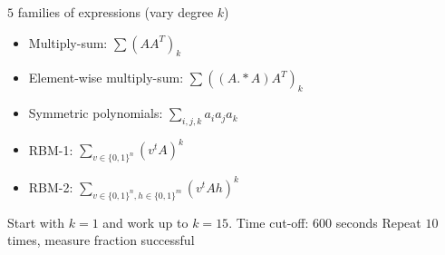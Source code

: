 \documentclass[landscape,a0b]{a0poster_csml_v2}
\begin{document}
\begin{poster}
\begin{PosterColumn}
$5$ families of expressions (vary degree $k$)
\begin{itemize}
  \item Multiply-sum: $\sum (AA^T)_k$
  \item Element-wise multiply-sum: $\sum ((A.* A)A^T)_k$
  \item Symmetric polynomials: $\sum_{i, j, k} a_ia_ja_k$
  \item RBM-1: $\sum_{v \in \{0, 1\}^n} (v^tA)^k$
  \item RBM-2: $\sum_{v \in \{0, 1\}^n, h \in \{0, 1\}^m} (v^tAh)^k$
\end{itemize}


Start with $k=1$ and work up to $k=15$.
Time cut-off: $600$ seconds
Repeat $10$ times, measure fraction successful



\end{PosterColumn}
\end{poster}
\end{document}
